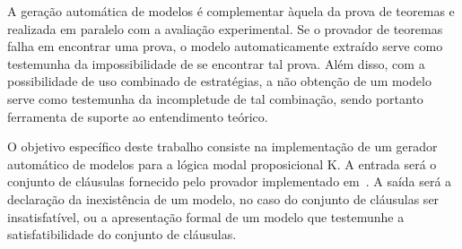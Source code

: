 A geração automática de modelos é complementar àquela da prova de teoremas e
realizada em paralelo com a avaliação experimental. Se o provador de teoremas
falha em encontrar uma prova, o modelo automaticamente extraído serve como
testemunha da impossibilidade de se encontrar tal prova. Além disso, com a
possibilidade de uso combinado de estratégias, a não obtenção de um modelo serve
como testemunha da incompletude de tal combinação, sendo portanto ferramenta de
suporte ao entendimento teórico.

O objetivo específico deste trabalho consiste na implementação de um gerador
automático de modelos para a lógica modal proposicional K. A entrada será o
conjunto de cláusulas fornecido pelo provador implementado
em~\cite{silva:impl_provador}. %
A saída será a declaração da inexistência de um modelo, no caso do conjunto de
cláusulas ser insatisfatível, ou a apresentação formal de um modelo que
testemunhe a satisfatibilidade do conjunto de cláusulas.













